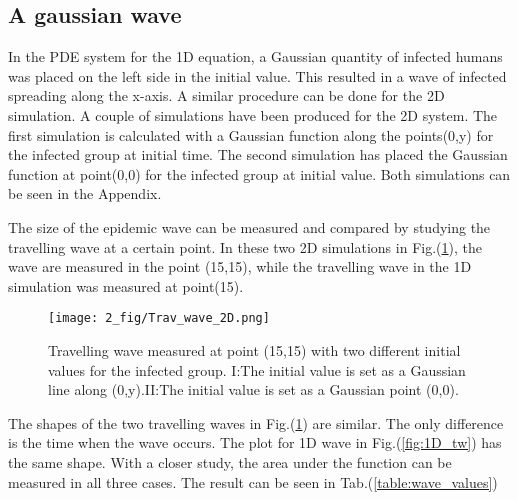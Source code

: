 \documentclass[%
twoside,                 %
final,                   %
chapterprefix=true,      %
open=right               %
10pt]{book}
\begin{document}
\subsection{A gaussian wave}
In the PDE system for the 1D equation, a Gaussian quantity of infected humans was placed on the left side in the initial value. This resulted in a wave of infected spreading along the x-axis. A similar procedure can be done for the 2D simulation. A couple of simulations have been produced for the 2D system. The first simulation is calculated with a Gaussian function along the points(0,y) for the infected group at initial time. The second simulation has placed the Gaussian function at point(0,0) for the infected group at initial value. Both simulations can be seen in the Appendix.  


\vspace{3mm}




\vspace{3mm}


The size of the epidemic wave can be measured and compared by studying the travelling wave at a certain point. In these two 2D simulations in Fig.(\ref{fig:2D_trav_wave}), the wave are measured in the point (15,15), while the travelling wave in the 1D simulation was measured at point(15). 


\begin{figure}[ht]
  \centerline{\texttt{[image: 2\_fig/Trav\_wave\_2D.png]}}
  \caption{
  \label{fig:2D_trav_wave} Travelling wave measured at point (15,15) with two different initial values for the infected group. I:The initial value is set as a Gaussian line along (0,y).II:The initial value is set as a Gaussian point (0,0).
  }
\end{figure}




\vspace{3mm}




\vspace{3mm}


The shapes of the two travelling waves in Fig.(\ref{fig:2D_trav_wave}) are similar. The only difference is the time when the wave occurs. The plot for 1D wave in Fig.(\ref{fig:1D_tw}) has the same shape. With a closer study, the area under the function can be measured in all three cases. The result can be seen in Tab.(\ref{table:wave_values})   

\end{document}
